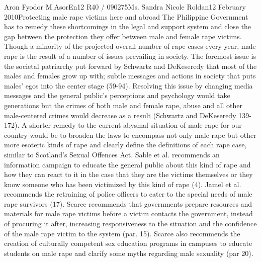 \documentclass[12pt,letterpaper]{article}
\begin{document}
\begin{mla}{Aron Fyodor M.}{Asor}{En12 R40 / 090275}{Ms. Sandra Nicole Roldan}{12 February 2010}{Protecting male rape victims here and abroad}
\tab The Philippine Government has to remedy these shortcomings in the legal and support system and close the gap between the protection they offer between male and female rape victims. Though a minority of the projected overall number of rape cases every year, male rape is the result of a number of issues prevailing in society. The foremost issue is the societal patriarchy put forward by Schwartz and DeKeseredy that most of the males and females grow up with; subtle messages and actions in society that puts males' egos into the center stage (59-94). Resolving this issue by changing media messages and the general public's perceptions and psychology would take generations but the crimes of both male and female rape, abuse and all other male-centered crimes would decrease as a result (Schwartz and DeKeseredy 139-172). A shorter remedy to the current abysmal situation of male rape for our country would be to broaden the laws to encompass not only male rape but other more esoteric kinds of rape and clearly define the definitions of each rape case, similar to Scotland's Sexual Offences Act. Sable et al. recommends an information campaign to educate the general public about this kind of rape and how they can react to it in the case that they are the victims themselves or they know someone who has been victimized by this kind of rape (4). Jamel et al. recommends the retraining of police officers to cater to the special needs of male rape survivors (17). Scarce recommends that governments prepare resources and materials for male rape victims before a victim contacts the government, instead of procuring it after, increasing responsiveness to the situation and the confidence of the male rape victim to the system (par. 15). Scarce also recommends the creation of culturally competent sex education programs in campuses to educate students on male rape and clarify some myths regarding male sexuality (par 20).









\end{mla}
\end{document}
